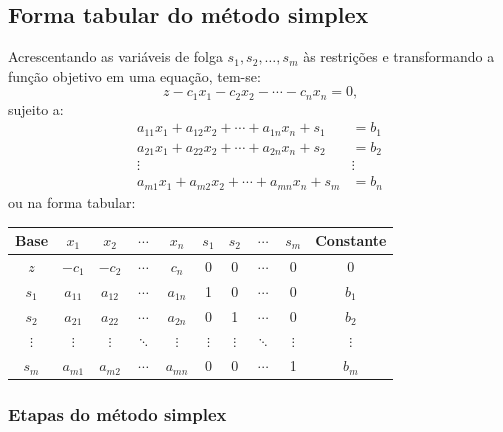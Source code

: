 \documentclass[
	12pt,				%
	openright,			%
	twoside,			%
	a4paper,			%
	english,			%
	french,				%
	brazil,				%
	sumario=tradicional
]{abntex2}
\numberwithin{example}{chapter}
\numberwithin{remark}{chapter}
\numberwithin{definition}{chapter}
\numberwithin{figure}{chapter}
\begin{document}
\subsection{Forma tabular do método simplex}

Acrescentando as variáveis de folga $s_1, s_2, \dots, s_m$ às restrições e transformando a função objetivo em uma equação, tem-se:
$$
    z-c_1 x_1 - c_2 x_2 - \cdots - c_n x_n = 0
    \text{,}
$$
sujeito a:
\begin{align*}
    a_{11}x_1 + a_{12}x_2 + \cdots + a_{1n}x_n + s_1 & = b_1\\
    a_{21}x_1 + a_{22}x_2 + \cdots + a_{2n}x_n + s_2 & = b_2\\
    \vdots \hspace{100pt} & \vdots\\
    a_{m1}x_1 + a_{m2}x_2 + \cdots + a_{mn}x_n + s_m & = b_n
\end{align*}
ou na forma tabular:
\begin{table}[h]
	\centering
	\begin{tabular}{|c|c|c|c|c|c|c|c|c|c|}
		\hline
		Base & $x_1$ & $x_2$ & $\cdots$ & $x_n$ & $s_1$ & $s_2$ & $\cdots$ & $s_m$ & Constante \\
	    \hline
	    $z$ & $-c_1$ & $-c_2$ & $\cdots$ & $c_n$ & 0 & 0 & $\cdots$ & 0 & 0\\
	    \hline
	    $s_1$ & $a_{11}$ & $a_{12}$ & $\cdots$ & $a_{1n}$ & 1 & 0 & $\cdots$ & 0 & $b_1$\\
	    \hline
	    $s_2$ & $a_{21}$ & $a_{22}$ & $\cdots$ & $a_{2n}$ & 0 & 1 & $\cdots$ & 0 & $b_2$\\
	    \hline
	    $\vdots$ & $\vdots$ & $\vdots$ & $\ddots$ & $\vdots$ & $\vdots$ & $\vdots$ & $\ddots$ & $\vdots$ & $\vdots$\\
	    \hline
	    $s_m$ & $a_{m1}$ & $a_{m2}$ & $\cdots$ & $a_{mn}$ & 0 & 0 & $\cdots$ & 1 & $b_m$\\
	    \hline
	\end{tabular}
\end{table}

\subsubsection{Etapas do método simplex}
\end{document}
